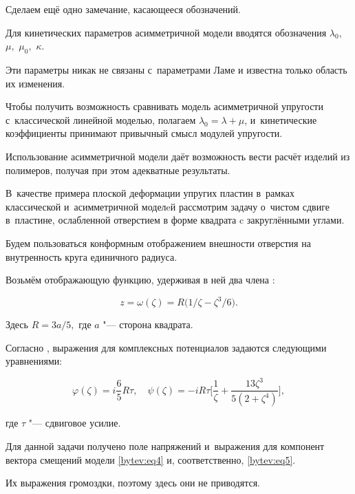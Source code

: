 Сделаем ещё одно замечание, касающееся обозначений. 

Для кинетических параметров асимметричной модели вводятся обозначения $\lambda_{0},$ $\mu,$ $\mu_{0},$ $\kappa$. 

Эти параметры никак не связаны с~параметрами Ламе и известна только область их изменения.

Чтобы получить возможность сравнивать модель асимметричной упругости с~классической линейной  моделью, полагаем $\lambda_{0}=\lambda+\mu$, и~кинетические коэффициенты принимают привычный смысл модулей упругости.



Использование асимметричной модели даёт возможность вести расчёт изделий из полимеров, получая при этом адекватные результаты.



\smallskip




В~качестве примера плоской деформации упругих пластин в~рамках классической и~асимметричной моделeй рассмотрим задачу о~чистом сдвиге в~пластине, ослабленной отверстием в форме квадрата c закруглёнными углами.



Будем пользоваться конформным отображением внешности отверстия на внутренность круга единичного радиуса. 

Возьмём отображающую функцию, удерживая в ней два члена \cite{Savin}:

$$z=\omega(\zeta)=R\Big(1/\zeta-\zeta^3/6\Big).$$

Здесь $R=3a/5,$ где $a$ "--- сторона квадрата.



Согласно \cite{Savin}, выражения для комплексных потенциалов задаются следующими уравнениями:

$$\varphi(\zeta)=i \frac{6}{5}R\tau,\quad \psi(\zeta)=\displaystyle-iR\tau\bigg[\frac{1}{\zeta}+\frac{13\zeta^3}{5(2+\zeta^4)}\bigg],$$

где $\tau$ "--- сдвиговое усилие. 

Для данной задачи получено поле напряжений и~выражения для компонент вектора смещений модели \eqref{bytev:eq4} и, соответственно, \eqref{bytev:eq5}. 

Их выражения громоздки, поэтому здесь они не приводятся.









